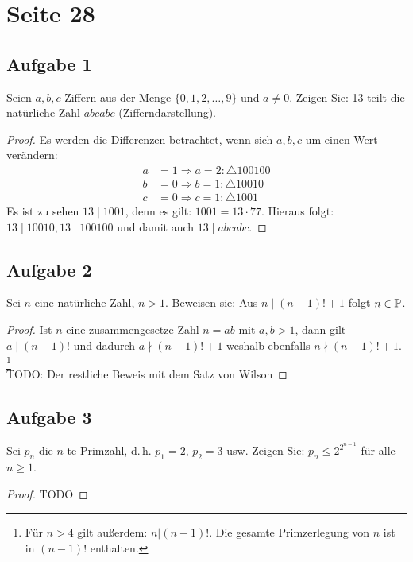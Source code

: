 \section{Seite 28}

\subsection{Aufgabe 1}
Seien $a,b,c$ Ziffern aus der Menge $\{0,1,2,\dotsc,9\}$ und $a \neq 0$.
Zeigen Sie: 13 teilt die natürliche Zahl $abcabc$ (Zifferndarstellung).
\begin{proof}
Es werden die Differenzen betrachtet, wenn sich $a, b, c$ um einen Wert verändern:
\begin{align*}
a &= 1 \Rightarrow a = 2: \triangle 100100 \\
b &= 0 \Rightarrow b = 1: \triangle 10010 \\
c &= 0 \Rightarrow c = 1: \triangle 1001
\end{align*}
Es ist zu sehen $13 \mid 1001$, denn es gilt: $1001 = 13 \cdot 77$.
Hieraus folgt: $13 \mid 10010, 13 \mid 100100$ und damit auch $13 \mid abcabc$. 
\end{proof}

\subsection{Aufgabe 2}
Sei $n$ eine natürliche Zahl, $n > 1$. Beweisen sie: Aus $n \mid (n - 1)! + 1$
folgt $n \in \mathbb{P}$.
\begin{proof}
Ist $n$ eine zusammengesetze Zahl $n = ab$ mit $a,b > 1$, dann gilt
$a \mid (n - 1)!$ und dadurch $a \nmid (n - 1)! + 1$ weshalb ebenfalls
$n \nmid (n - 1)! + 1$. \footnote{Für $n > 4$ gilt außerdem: $n | (n - 1)!$.
Die gesamte Primzerlegung von $n$ ist in $(n - 1)!$ enthalten.} \\[4pt]
TODO: Der restliche Beweis mit dem Satz von Wilson
\end{proof}

\subsection{Aufgabe 3}
Sei $p_n$ die $n$-te Primzahl, d.\,h. $p_1 = 2$, $p_2 = 3$ usw. Zeigen Sie:
$p_n \leq 2^{2^{n - 1}}$ für alle $n \geq 1$.
\begin{proof}
TODO
\end{proof}

